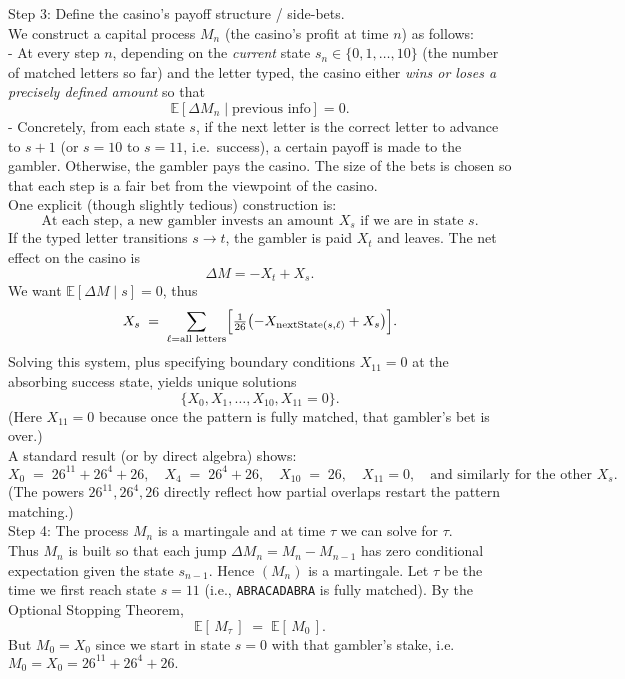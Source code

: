 \documentclass{article}
\begin{document}
\begin{enumerate}
{\[\]
\bigskip
Step 3: Define the casino's payoff structure / side-bets. \\
We construct a capital process $M_n$ (the casino's profit at time $n$) as follows: \\
- At every step $n$, depending on the \emph{current} state $s_n \in \{0,1,\dots,10\}$ (the number of matched letters so far) and the letter typed, the casino either \emph{wins or loses a precisely defined amount} so that
  \[
  \mathbb{E}[\Delta M_n \mid \text{previous info}] = 0.
  \]
- Concretely, from each state $s$, if the next letter is the correct letter to advance to $s+1$ (or $s=10$ to $s=11$, i.e.\ success), a certain payoff is made to the gambler. Otherwise, the gambler pays the casino. The size of the bets is chosen so that each step is a fair bet from the viewpoint of the casino.  \\
One explicit (though slightly tedious) construction is:
\[
\text{At each step, a new gambler invests an amount }X_{s}\text{ if we are in state }s.
\]
If the typed letter transitions $s\to t$, the gambler is paid $X_{t}$ and leaves. The net effect on the casino is
\[
\Delta M = - X_{t} + X_{s}.
\]
We want 
\(\mathbb{E}[\Delta M \mid s] = 0\),
thus
\[
X_{s} \;=\; \sum_{\ell= \text{all letters}} \Bigl[\tfrac{1}{26} \bigl(-X_{\text{nextState}(s,\ell)} + X_s\bigr)\Bigr].
\]
Solving this system, plus specifying boundary conditions $X_{11}=0$ at the absorbing success state, yields unique solutions
\[
\{X_0, X_1,\dots, X_{10}, X_{11}=0\}.
\]
(Here $X_{11}=0$ because once the pattern is fully matched, that gambler’s bet is over.) \\
A standard result (or by direct algebra) shows:
\[
X_0 \;=\; 26^{11} + 26^{4} + 26,
\quad
X_4 \;=\; 26^4 + 26,
\quad
X_{10} \;=\; 26,
\quad
X_{11}=0,
\quad
\text{and similarly for the other }X_s.
\]
(The powers $26^{11}, 26^4, 26$ directly reflect how partial overlaps restart the pattern matching.) \\
\bigskip
Step 4: The process $M_n$ is a martingale and at time $\tau$ we can solve for $\tau$. \\
Thus $M_n$ is built so that each jump 
\(\Delta M_n = M_n - M_{n-1}\) 
has zero conditional expectation given the state $s_{n-1}$. Hence $(M_n)$ is a martingale. Let $\tau$ be the time we first reach state $s=11$ (i.e., \texttt{ABRACADABRA} is fully matched). By the Optional Stopping Theorem,
\[
\mathbb{E}[\,M_{\tau}\,] 
\;=\; \mathbb{E}[\,M_0\,].
\]
But $M_0 = X_0$ since we start in state $s=0$ with that gambler's stake, i.e.\ $M_0 = X_0 = 26^{11} + 26^4 + 26.$ \\
}
\end{enumerate}
\end{document}
